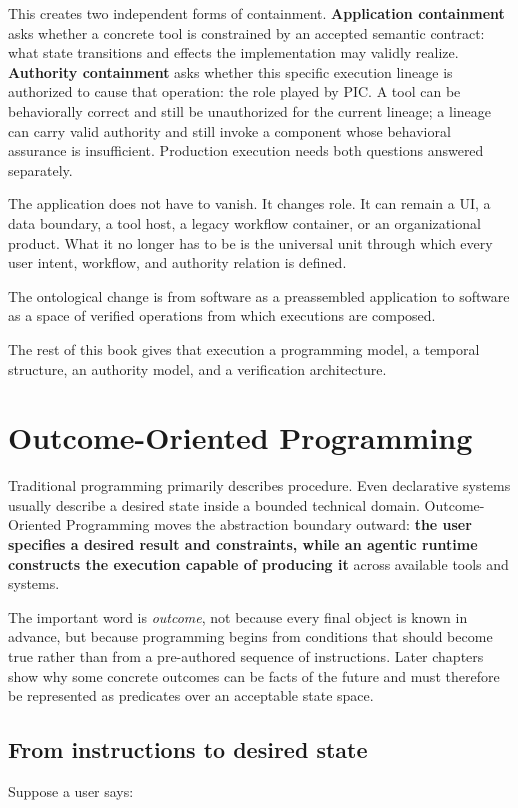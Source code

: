 \documentclass[10pt,oneside,openany]{book}
\newcommand{\term}[1]{\textbf{#1}}
\newcommand{\keyidea}[1]{%
  \vspace{3pt}
  \noindent\fbox{\begin{minipage}{0.94\linewidth}\small\raggedright\textbf{Key idea.} #1\end{minipage}}
  \vspace{3pt}
}
\renewcommand{\keyidea}[1]{\begin{keyideabox}#1\end{keyideabox}}
\begin{document}
This creates two independent forms of containment. \term{Application containment} asks whether a concrete tool is constrained by an accepted semantic contract: what state transitions and effects the implementation may validly realize. \term{Authority containment} asks whether this specific execution lineage is authorized to cause that operation: the role played by PIC. A tool can be behaviorally correct and still be unauthorized for the current lineage; a lineage can carry valid authority and still invoke a component whose behavioral assurance is insufficient. Production execution needs both questions answered separately.

The application does not have to vanish. It changes role. It can remain a UI, a data boundary, a tool host, a legacy workflow container, or an organizational product. What it no longer has to be is the universal unit through which every user intent, workflow, and authority relation is defined.

\keyidea{The ontological change is from software as a preassembled application to software as a space of verified operations from which executions are composed.}

The rest of this book gives that execution a programming model, a temporal structure, an authority model, and a verification architecture.

\chapter{Outcome-Oriented Programming}

Traditional programming primarily describes procedure. Even declarative systems usually describe a desired state inside a bounded technical domain. Outcome-Oriented Programming moves the abstraction boundary outward: \textbf{the user specifies a desired result and constraints, while an agentic runtime constructs the execution capable of producing it} across available tools and systems.

The important word is \emph{outcome}, not because every final object is known in advance, but because programming begins from conditions that should become true rather than from a pre-authored sequence of instructions. Later chapters show why some concrete outcomes can be facts of the future and must therefore be represented as predicates over an acceptable state space.

\section{From instructions to desired state}
Suppose a user says:
\end{document}
